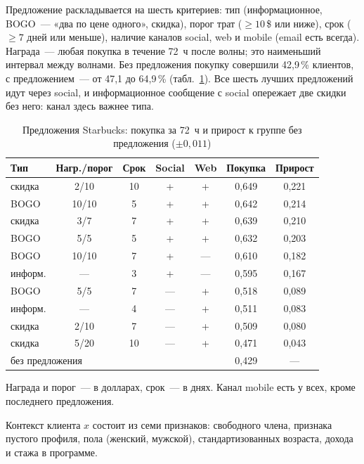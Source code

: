 \documentclass{misisarticle}
\begin{document}
Предложение раскладывается на шесть критериев: тип (информационное, BOGO~--- «два по цене одного», скидка), порог трат ($\geqslant 10$\,\$ или ниже), срок ($\geqslant 7$ дней или меньше), наличие каналов social, web и mobile (email есть всегда). Награда~--- любая покупка в течение 72~ч после волны; это наименьший интервал между волнами. Без предложения покупку совершили 42,9\,\% клиентов, с предложением~--- от 47,1 до 64,9\,\% (табл.~\ref{tab:offers}). Все шесть лучших предложений идут через social, и информационное сообщение с social опережает две скидки без него: канал здесь важнее типа.

\begin{table}[htbp]
  \caption{Предложения Starbucks: покупка за 72~ч и прирост к группе без предложения ($\pm 0{,}011$)}
  \label{tab:offers}
  \centering
  \footnotesize
  \setlength{\tabcolsep}{3pt}
  \begin{tabular}{lcccccc}
    \toprule
    \textbf{Тип} & \textbf{Нагр./порог} & \textbf{Срок} & \textbf{Social} & \textbf{Web} & \textbf{Покупка} & \textbf{Прирост} \\
    \midrule
    скидка & 2/10 & 10 & + & + & 0,649 & 0,221 \\
    BOGO & 10/10 & 5 & + & + & 0,642 & 0,214 \\
    скидка & 3/7 & 7 & + & + & 0,639 & 0,210 \\
    BOGO & 5/5 & 5 & + & + & 0,632 & 0,203 \\
    BOGO & 10/10 & 7 & + & --- & 0,610 & 0,182 \\
    информ. & --- & 3 & + & --- & 0,595 & 0,167 \\
    BOGO & 5/5 & 7 & --- & + & 0,518 & 0,089 \\
    информ. & --- & 4 & --- & + & 0,511 & 0,083 \\
    скидка & 2/10 & 7 & --- & + & 0,509 & 0,080 \\
    скидка & 5/20 & 10 & --- & + & 0,471 & 0,043 \\
    \midrule
    \multicolumn{5}{l}{без предложения} & 0,429 & --- \\
    \bottomrule
  \end{tabular}

  \vspace{1mm}
  \footnotesize Награда и порог~--- в долларах, срок~--- в днях. Канал mobile есть у всех, кроме последнего предложения.
\end{table}

Контекст клиента $x$ состоит из семи признаков: свободного члена, признака пустого профиля, пола (женский, мужской), стандартизованных возраста, дохода и стажа в программе.
\end{document}
